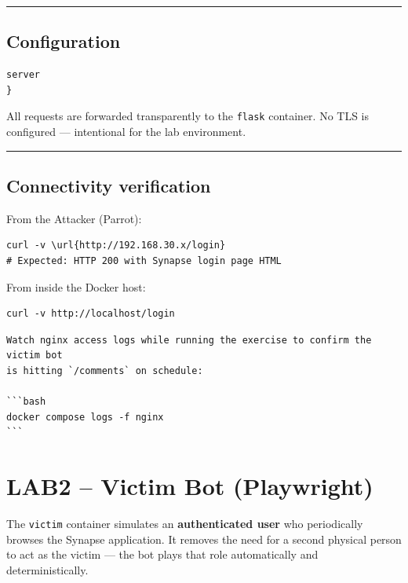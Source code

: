 \begin{center}\rule{0.5\linewidth}{0.5pt}\end{center}

\subsection{Configuration}

\begin{lstlisting}
server 
}
\end{lstlisting}

All requests are forwarded transparently to the \texttt{flask} container. No TLS is configured --- intentional for the lab environment.

\begin{center}\rule{0.5\linewidth}{0.5pt}\end{center}

\subsection{Connectivity verification}

From the Attacker (Parrot):

\begin{lstlisting}
curl -v \url{http://192.168.30.x/login}
# Expected: HTTP 200 with Synapse login page HTML
\end{lstlisting}

From inside the Docker host:

\begin{lstlisting}
curl -v http://localhost/login
\end{lstlisting}

\begin{lstlisting}
Watch nginx access logs while running the exercise to confirm the victim bot
is hitting `/comments` on schedule:

```bash
docker compose logs -f nginx
```
\end{lstlisting}

\section{LAB2 -- Victim Bot (Playwright)}

The \texttt{victim} container simulates an \textbf{authenticated user} who periodically browses the Synapse application. It removes the need for a second physical person to act as the victim --- the bot plays that role automatically and deterministically.

